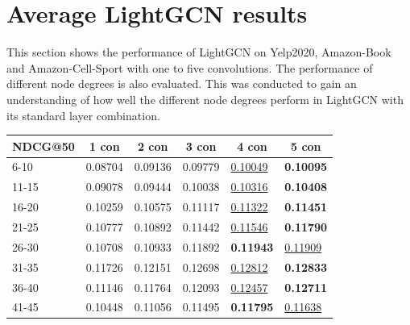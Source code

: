 \section{Average LightGCN results}\label{app:average-lightgcn-results}
This section shows the performance of LightGCN on Yelp2020, Amazon-Book and Amazon-Cell-Sport with one to five convolutions.
The performance of different node degrees is also evaluated.
This was conducted to gain an understanding of how well the different node degrees perform in LightGCN with its standard layer combination.
\begin{table}[]
    \centering
    \begin{tabular}{|l|l|l|l|l|l|}
        \hline
        NDCG@50   & \multicolumn{1}{c|}{1 con} & \multicolumn{1}{c|}{2 con} & \multicolumn{1}{c|}{3 con} & \multicolumn{1}{c|}{4 con} & \multicolumn{1}{c|}{5 con} \\ \hline
        6-10      & 0.08704                    & 0.09136                    & 0.09779                    & \underline{0.10049}        & \textbf{0.10095}           \\ \hline
        11-15     & 0.09078                    & 0.09444                    & 0.10038                    & \underline{0.10316}        & \textbf{0.10408}           \\ \hline
        16-20     & 0.10259                    & 0.10575                    & 0.11117                    & \underline{0.11322}        & \textbf{0.11451}           \\ \hline
        21-25     & 0.10777                    & 0.10892                    & 0.11442                    & \underline{0.11546}        & \textbf{0.11790}           \\ \hline
        26-30     & 0.10708                    & 0.10933                    & 0.11892                    & \textbf{0.11943}           & \underline{0.11909}        \\ \hline
        31-35     & 0.11726                    & 0.12151                    & 0.12698                    & \underline{0.12812}        & \textbf{0.12833}           \\ \hline
        36-40     & 0.11146                    & 0.11764                    & 0.12093                    & \underline{0.12457}        & \textbf{0.12711}           \\ \hline
        41-45     & 0.10448                    & 0.11056                    & 0.11495                    & \textbf{0.11795}           & \underline{0.11638}        \\ \hline

\end{tabular}
\end{table}
